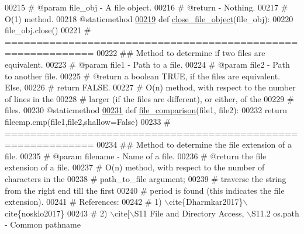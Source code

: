 \begin{DoxyCode}
00215     \textcolor{comment}{#   @param file\_obj - A file object.}
00216     \textcolor{comment}{#   @return - Nothing.}
00217     \textcolor{comment}{#   O(1) method.}
00218     @staticmethod
\hypertarget{file__io_8py_source_l00219}{}\hyperlink{classutilities_1_1file__io_1_1file__io__operations_a15cce5bd7767b057cdc569f393c24866}{00219}     \textcolor{keyword}{def }\hyperlink{classutilities_1_1file__io_1_1file__io__operations_a15cce5bd7767b057cdc569f393c24866}{close\_file\_object}(file\_obj):
00220         file\_obj.close()
00221     \textcolor{comment}{# ============================================================}
00222     \textcolor{comment}{##  Method to determine if two files are equivalent.}
00223     \textcolor{comment}{#   @param file1 - Path to a file.}
00224     \textcolor{comment}{#   @param file2 - Path to another file.}
00225     \textcolor{comment}{#   @return a boolean TRUE, if the files are equivalent. Else,}
00226     \textcolor{comment}{#       return FALSE.}
00227     \textcolor{comment}{#   O(n) method, with respect to the number of lines in the}
00228     \textcolor{comment}{#       larger (if the files are different), or either, of the}
00229     \textcolor{comment}{#       files.}
00230     @staticmethod
\hypertarget{file__io_8py_source_l00231}{}\hyperlink{classutilities_1_1file__io_1_1file__io__operations_a9b3808ff6b165f5e73b780036f73a917}{00231}     \textcolor{keyword}{def }\hyperlink{classutilities_1_1file__io_1_1file__io__operations_a9b3808ff6b165f5e73b780036f73a917}{file\_comparison}(file1, file2):
00232         \textcolor{keywordflow}{return} filecmp.cmp(file1,file2,shallow=\textcolor{keyword}{False})
00233     \textcolor{comment}{# ============================================================}
00234     \textcolor{comment}{##  Method to determine the file extension of a file.}
00235     \textcolor{comment}{#   @param filename - Name of a file.}
00236     \textcolor{comment}{#   @return the file extension of a file.}
00237     \textcolor{comment}{#   O(n) method, with respect to the number of characters in the}
00238     \textcolor{comment}{#       path\_to\_file argument;}
00239     \textcolor{comment}{#       traverse the string from the right end till the first}
00240     \textcolor{comment}{#           period is found (this indicates the file extension).}
00241     \textcolor{comment}{#   References:}
00242     \textcolor{comment}{#   1) \(\backslash\)cite\{Dharmkar2017\}\(\backslash\)cite\{nosklo2017\}}
00243     \textcolor{comment}{#   2) \(\backslash\)cite[\(\backslash\)S11 File and Directory Access, \(\backslash\)S11.2 os.path - Common pathname
}
\end{DoxyCode}
